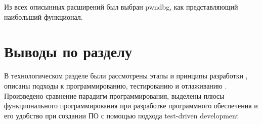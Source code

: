 Из всех описынных расширений был выбран pwndbg, как представляющий
наибольший функционал.


\section{Выводы по разделу}\label{sec:ch1/sec2}
В технологическом разделе были рассмотрены этапы и принципы разработки {\ProgModule}, 
описаны подходы к программированию, тестированию и отлаживанию {\ProgModule}.
Произведено сравнение парадигм программирования, выделены плюсы функционального
программирования при разработке программного обеспечения и его удобство при 
создании ПО с помощью подхода test-driven development
